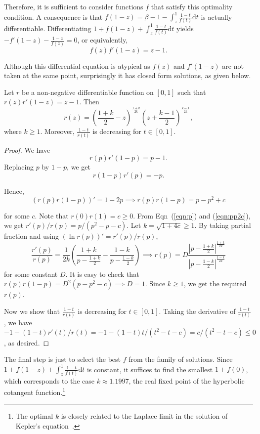 \documentclass{article}
\begin{document}
Therefore, it is sufficient to consider functions $f$ that satisfy this optimality condition. A consequence is that $f(1-z)=\beta-1-\int_z^1 \frac{1-t}{f(t)}\mathrm{d}t$ is actually differentiable. Differentiating $1+f(1-z)+\int_z^1 \frac{1-t}{f(t)}\mathrm{d}t$ yields $-f'(1-z)-\frac{1-z}{f(z)}=0$, or equivalently, $$f(z)f'(1-z)=z-1.$$

Although this differential equation is atypical as $f(z)$ and $f'(1-z)$ are not taken at the same point, surprisingly it has closed form solutions, as given below.
\begin{lemma}
Let $r$ be a non-negative differentiable function on $[0,1]$ such that $r(z)r'(1-z)=z-1$. Then $$r(z)=\left(\frac{1+k}{2}-z\right)^{\frac{1+k}{2k}}\left(z+\frac{k-1}{2}\right)^{\frac{k-1}{2k}},$$where $k\geq1$. Moreover, $\frac{1-t}{r(t)}$ is decreasing for $t\in [0,1]$.
\end{lemma}
\begin{proof}
We have 
\[
r(p)r'(1-p)=p-1.
\]
Replacing $p$ by $1-p$, we get 
\begin{equation}
\label{eqn:p}
r(1-p)r'(p)=-p.
\end{equation}

Hence,
\begin{equation}
\label{eqn:pp2c}
(r(p)r(1-p))'=1-2p\implies r(p)r(1-p)=p-p^{2}+c
\end{equation}

for some $c$. Note that $r(0)r(1)=c \ge 0$. 
From Eqn~(\ref{eqn:p}) and (\ref{eqn:pp2c}), we get $r'(p)/r(p)=p/(p^{2}-p-c)$.
Let $k=\sqrt{1+4c}\geq 1$. By taking partial fraction and using $(\ln r(p))'=r'(p)/r(p)$,
\[
\frac{r'(p)}{r(p)}=\frac{1}{2k}\left(\frac{1+k}{p-\frac{1+k}{2}}-\frac{1-k}{p-\frac{1-k}{2}}\right)\implies r(p)=D\frac{\left|p-\frac{1+k}{2}\right|^{\frac{1+k}{2k}}}{\left|p-\frac{1-k}{2}\right|^{\frac{1-k}{2k}}}
\]
for some constant $D$. It is easy to check that $r(p)r(1-p)=D^{2}(p-p^{2}-c)\implies D=1$. Since $k\geq 1$, we get the required $r(p)$.

Now we show that
$\frac{1-t}{r(t)}$ is decreasing for $t\in [0,1]$. Taking the derivative of $\frac{1-t}{r(t)}$, we have $-1-(1-t)r'(t)/r(t)=-1-(1-t)t/(t^{2}-t-c)=c/(t^{2}-t-c)\leq 0$,
as desired.
\end{proof}

The final step is just to select the best $f$ from the family of solutions. Since $1+f(1-z)+\int_z^1 \frac{1-t}{f(t)}\mathrm{d}t$ is constant, it suffices to find the smallest $1+f(0)$, which corresponds to the case $k\approx1.1997$, the real fixed point of the hyperbolic cotangent function.\footnote{The optimal $k$ is closely related to the Laplace limit in the solution of Kepler's equation~\cite{weisstein}.}
\end{document}
